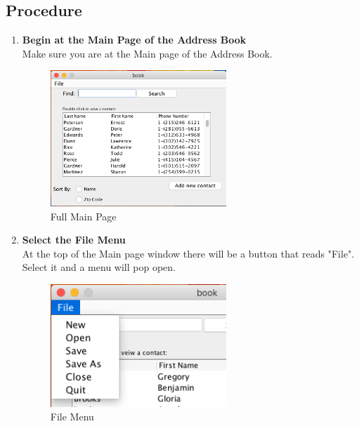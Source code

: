\documentclass[a4paper, 11pt]{article}
\begin{document}
\subsection{Procedure}
\begin{enumerate}[label=\textbf{\arabic*})]
    \item{\textbf{Begin at the Main Page of the Address Book}}\\ Make sure you are at the Main page of the Address Book.
    
    \begin{figure}[h!]
    \centering
      \includegraphics[width=250]{main_page_full.png}
      \caption{Full Main Page}
    \end{figure}
    
    \item{\textbf{Select the File Menu}}\\ At the top of the Main page window there will be a button that reads "File". Select it and a menu will pop open.
    
    \begin{figure}[h!]
    \centering
      \includegraphics[width=250]{file_menu.png}
      \caption{File Menu}
    \end{figure} 
    

\end{enumerate}
\end{document}
